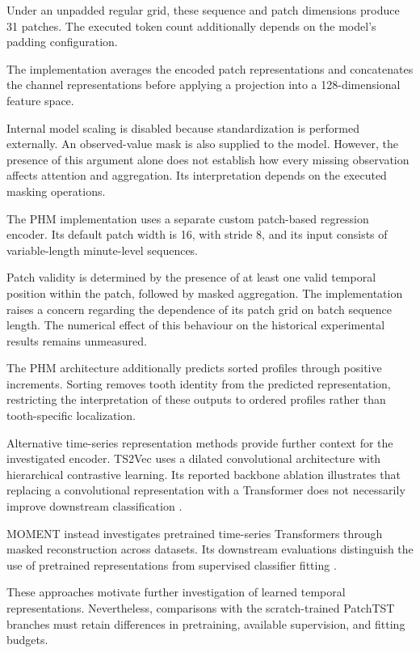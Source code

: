 Under an unpadded regular grid, these sequence and patch dimensions produce 31 patches. The executed token count additionally depends on the model’s padding configuration.

The implementation averages the encoded patch representations and concatenates the channel representations before applying a projection into a 128-dimensional feature space.

Internal model scaling is disabled because standardization is performed externally. An observed-value mask is also supplied to the model. However, the presence of this argument alone does not establish how every missing observation affects attention and aggregation. Its interpretation depends on the executed masking operations.

The PHM implementation uses a separate custom patch-based regression encoder. Its default patch width is 16, with stride 8, and its input consists of variable-length minute-level sequences.

Patch validity is determined by the presence of at least one valid temporal position within the patch, followed by masked aggregation. The implementation raises a concern regarding the dependence of its patch grid on batch sequence length. The numerical effect of this behaviour on the historical experimental results remains unmeasured.

The PHM architecture additionally predicts sorted profiles through positive increments. Sorting removes tooth identity from the predicted representation, restricting the interpretation of these outputs to ordered profiles rather than tooth-specific localization.

Alternative time-series representation methods provide further context for the investigated encoder. TS2Vec uses a dilated convolutional architecture with hierarchical contrastive learning. Its reported backbone ablation illustrates that replacing a convolutional representation with a Transformer does not necessarily improve downstream classification \parencite{P012}.

MOMENT instead investigates pretrained time-series Transformers through masked reconstruction across datasets. Its downstream evaluations distinguish the use of pretrained representations from supervised classifier fitting \parencite{P018}.

These approaches motivate further investigation of learned temporal representations. Nevertheless, comparisons with the scratch-trained PatchTST branches must retain differences in pretraining, available supervision, and fitting budgets.

